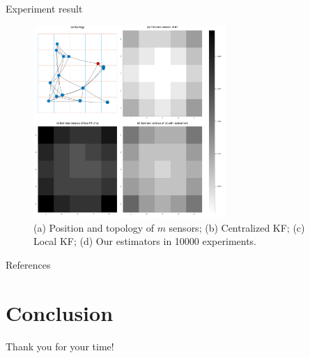 \documentclass[10pt]{beamer}
\DeclareMathOperator{\1}{\textbf{1}}
\begin{document}
\begin{frame}{Experiment result}
	\begin{figure}[]
		\centering
		\includegraphics[width=0.65\textwidth]{pic/variance.pdf}
		\caption{(a) Position and topology of $m$ sensors; (b) Centralized KF; (c) Local KF; (d) Our estimators in 10000 experiments.}
		\label{fig:heatmap}
	\end{figure}
\end{frame}

\begin{frame}[allowframebreaks]{References}
	
  \end{frame}

  \section{Conclusion}

\begin{frame}[standout]
 Thank you for your time! 
\end{frame}
\end{document}
